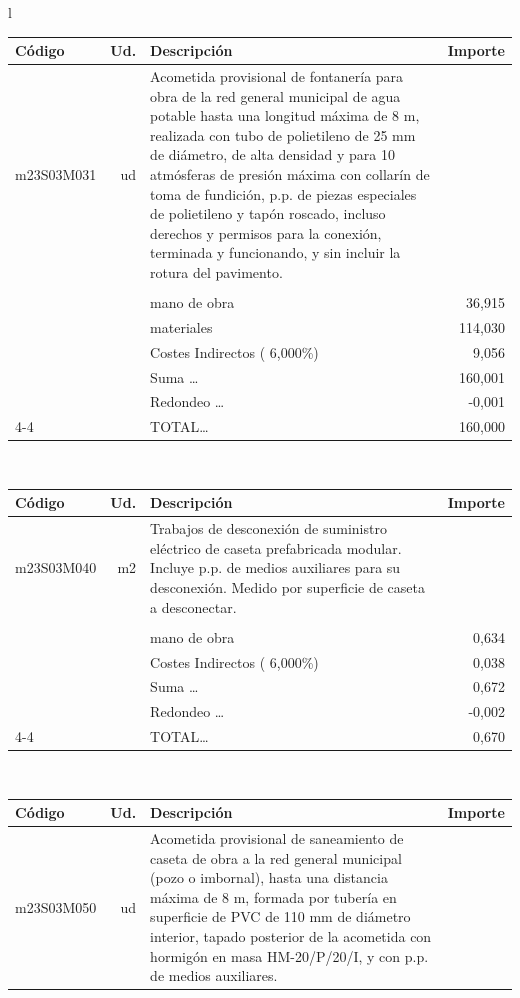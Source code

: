 \documentclass{book}%
\begin{document}
\begin{longtable}{l}
\begin{tabular}{l r p{60mm} r}
Código&Ud.&Descripción&Importe\\%
\hline%
m23S03M031&ud&Acometida provisional de fontanería para obra de la red general municipal de agua potable hasta una longitud máxima de 8 m, realizada con tubo de polietileno de 25 mm de diámetro, de alta densidad y para 10 atmósferas de presión máxima con collarín de toma de fundición, p.p. de piezas especiales de polietileno y tapón roscado, incluso derechos y permisos para la conexión, terminada y funcionando, y sin incluir la rotura del pavimento.&\\%
&&&\\%
&&mano de obra&    36,915\\%
&&materiales&   114,030\\%
&&Costes Indirectos (     6,000\%)&     9,056\\%
&&Suma \ldots&   160,001\\%
&&Redondeo \ldots&    {-}0,001\\%
\cline{4-4}%
&&TOTAL\ldots&   160,000\\%
\end{tabular}\\%
\begin{tabular}{l r p{60mm} r}%
Código&Ud.&Descripción&Importe\\%
\hline%
m23S03M040&m2&Trabajos de desconexión de suministro eléctrico de caseta prefabricada modular. Incluye p.p. de medios auxiliares para su desconexión. Medido por superficie de caseta a desconectar.&\\%
&&&\\%
&&mano de obra&     0,634\\%
&&Costes Indirectos (     6,000\%)&     0,038\\%
&&Suma \ldots&     0,672\\%
&&Redondeo \ldots&    {-}0,002\\%
\cline{4-4}%
&&TOTAL\ldots&     0,670\\%
\end{tabular}\\%
\begin{tabular}{l r p{60mm} r}%
Código&Ud.&Descripción&Importe\\%
\hline%
m23S03M050&ud&Acometida provisional de saneamiento de caseta de obra a la red general municipal (pozo o imbornal), hasta una distancia máxima de 8 m, formada por tubería en superficie de PVC de 110 mm de diámetro interior, tapado posterior de la acometida con hormigón en masa HM{-}20/P/20/I, y con p.p. de medios auxiliares.&\\%

\end{tabular}
\end{longtable}
\end{document}
